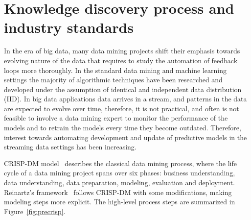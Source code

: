 \documentclass{llncs}
\begin{document}
\section{Knowledge discovery process and industry standards}
\label{sec:background}

In the era of big data, many data mining projects shift their emphasis towards evolving nature of the data that requires to study the automation of feedback loops more thoroughly.
In the standard data mining and machine learning settings the majority of algorithmic techniques have been researched and developed under the assumption of identical and independent data distribution (IID).
In big data applications data arrives in a stream, and patterns in the data are expected to evolve over time, therefore, it is not practical, and often is not feasible to involve a data mining expert to monitor the performance of the models and to retrain the models every time they become outdated. Therefore, interest towards automating development and update of predictive models in the streaming data settings has been increasing.

CRISP-DM model~\cite{crisp} describes the classical data mining process,
where the life cycle of a data mining project spans over six phases:
business understanding, data understanding, data preparation, modeling, evaluation and deployment.
Reinartz's framework~\cite{DBLP:books/sp/Reinartz99} follows CRISP-DM with some modifications, making modeling steps more explicit. The high-level process steps are summarized in Figure~\ref{fig:precrisp}.
\end{document}
